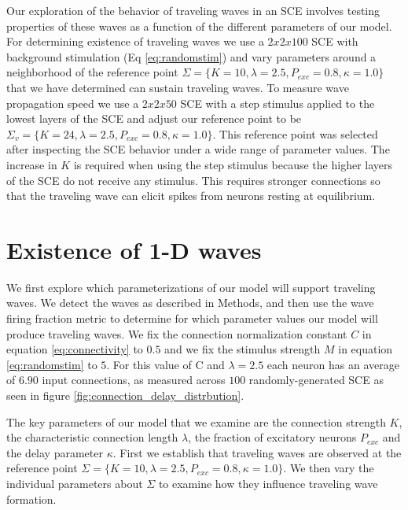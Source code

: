Our exploration of the behavior of traveling waves in an SCE involves testing properties of these waves as a function of the different parameters of our model.
For determining existence of traveling waves we use a $2x2x100$ SCE  with background stimulation (Eq \ref{eq:randomstim}) and vary parameters around a neighborhood of the reference point $\Sigma = \{K=10,\lambda=2.5,P_{exc}=0.8,\kappa=1.0 \}$ that we have determined can sustain traveling waves.
To measure wave propagation speed we use a $2x2x50$ SCE with  a step stimulus applied to the lowest layers of the SCE and adjust our reference point to be $\Sigma_v = \{K=24,\lambda=2.5,P_{exc}=0.8,\kappa=1.0 \}$.
This reference point was selected after inspecting the SCE behavior under a wide range of parameter values.
The increase in $K$ is required when using the step stimulus because the higher layers of the SCE do not receive any stimulus.
This requires stronger connections so that the traveling wave can elicit spikes from neurons resting at equilibrium.

\FloatBarrier

\section{Existence of 1-D waves} \label{sub:waves}
We first explore which parameterizations of our model will support traveling waves.
We detect the waves as described in Methods, and then use the wave firing fraction metric to determine for which parameter values our model will produce traveling waves.
We fix the connection normalization constant $C$ in equation \ref{eq:connectivity} to $0.5$ and we fix the stimulus strength $M$ in equation \ref{eq:randomstim} to $5$.
For this value of C and $\lambda=2.5$ each neuron has an average of $6.90$ input connections, as measured across $100$ randomly-generated SCE as seen in figure \ref{fig:connection_delay_distrbution}.

The key parameters of our model that we examine are the connection strength $K$, the characteristic connection length $\lambda$, the fraction of excitatory neurons $P_{exc}$ and the delay parameter $\kappa$.
First we establish that traveling waves are observed at the reference  point $\Sigma = \{K=10,\lambda=2.5,P_{exc}=0.8,\kappa=1.0 \}$.
We then vary the individual parameters about $\Sigma$ to examine how they influence traveling wave formation.

